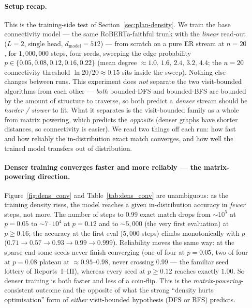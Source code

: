 \documentclass[11pt,a4paper]{article}
\begin{document}
\paragraph{Setup recap.} This is the training-side test of Section~\ref{sec:plan-density}. We
train the base connectivity model --- the same RoBERTa-faithful trunk with the \emph{linear}
read-out ($L=2$, single head, $d_{\mathrm{model}}=512$) --- from scratch on a pure ER stream at
$n=20$, for $1{,}000{,}000$ steps, four seeds, sweeping the edge probability
$p\in\{0.05,0.08,0.12,0.16,0.22\}$ (mean degree $\approx 1.0,\,1.6,\,2.4,\,3.2,\,4.4$; the
$n=20$ connectivity threshold $\ln 20/20\approx 0.15$ sits inside the sweep). Nothing else
changes between runs. This experiment does \emph{not} separate the two visit-bounded algorithms
from each other --- \emph{both} bounded-DFS and bounded-BFS are bounded by the amount of structure
to traverse, so both predict a \emph{denser} stream should be \emph{harder / slower} to fit. What
it separates is the visit-bounded family as a whole from matrix powering, which predicts the
\emph{opposite} (denser graphs have shorter distances, so connectivity is easier). We read two
things off each run: how fast and how reliably the in-distribution exact match converges, and
how well the trained model transfers out of distribution.

\paragraph{Denser training converges faster and more reliably --- the matrix-powering
direction.} Figure~\ref{fig:dens_conv} and Table~\ref{tab:dens_conv} are unambiguous: as the
training density rises, the model reaches a given in-distribution accuracy in \emph{fewer}
steps, not more. The number of steps to $0.99$ exact match drops from $\sim\!10^5$ at $p=0.05$
to $\sim\!7\cdot10^4$ at $p=0.12$ and to $\sim\!5{,}000$ (the very first evaluation) at
$p\ge0.16$; the accuracy at the first eval ($5{,}000$ steps) climbs monotonically with $p$
($0.71\to0.57\to0.93\to0.99\to0.999$). Reliability moves the same way: at the sparse end some
seeds never finish converging (one of four at $p=0.05$, two of four at $p=0.08$ plateau at
$\approx0.95$--$0.98$, never crossing $0.99$ --- the familiar seed lottery of Reports~I--III),
whereas every seed at $p\ge0.12$ reaches exactly $1.00$. So denser training is both faster and
less of a coin-flip. This is the \emph{matrix-powering}-consistent outcome and the opposite of
what the strong ``density hurts optimisation'' form of \emph{either} visit-bounded hypothesis
(DFS or BFS) predicts.
\end{document}
